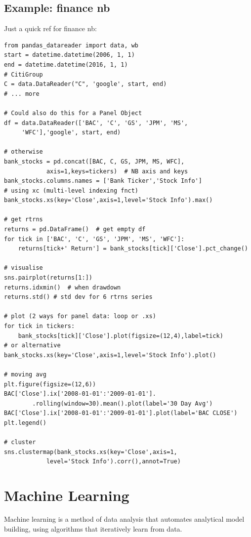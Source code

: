 \documentclass[12pt]{article}
\begin{document}
\subsection{Example: finance nb}
Just a quick ref for finance nb:
\begin{lstlisting}
from pandas_datareader import data, wb
start = datetime.datetime(2006, 1, 1)
end = datetime.datetime(2016, 1, 1)
# CitiGroup
C = data.DataReader("C", 'google', start, end)
# ... more

# Could also do this for a Panel Object
df = data.DataReader(['BAC', 'C', 'GS', 'JPM', 'MS',
	 'WFC'],'google', start, end)

# otherwise
bank_stocks = pd.concat([BAC, C, GS, JPM, MS, WFC],
			axis=1,keys=tickers)  # NB axis and keys
bank_stocks.columns.names = ['Bank Ticker','Stock Info']
# using xc (multi-level indexing fnct)
bank_stocks.xs(key='Close',axis=1,level='Stock Info').max()

# get rtrns
returns = pd.DataFrame()  # get empty df
for tick in ['BAC', 'C', 'GS', 'JPM', 'MS', 'WFC']:  
	returns[tick+' Return'] = bank_stocks[tick]['Close'].pct_change()

# visualise
sns.pairplot(returns[1:])
returns.idxmin()  # when drawdown
returns.std() # std dev for 6 rtrns series

# plot (2 ways for panel data: loop or .xs)
for tick in tickers:
	bank_stocks[tick]['Close'].plot(figsize=(12,4),label=tick)
# or alternative
bank_stocks.xs(key='Close',axis=1,level='Stock Info').plot()

# moving avg
plt.figure(figsize=(12,6))
BAC['Close'].ix['2008-01-01':'2009-01-01'].
		.rolling(window=30).mean().plot(label='30 Day Avg')
BAC['Close'].ix['2008-01-01':'2009-01-01'].plot(label='BAC CLOSE')
plt.legend()

# cluster
sns.clustermap(bank_stocks.xs(key='Close',axis=1,
			level='Stock Info').corr(),annot=True)
\end{lstlisting}

\section{Machine Learning} \label{sec:Machine}
Machine learning is a method of data analysis that automates analytical model building, using algorithms that iteratively learn from data.
\end{document}
